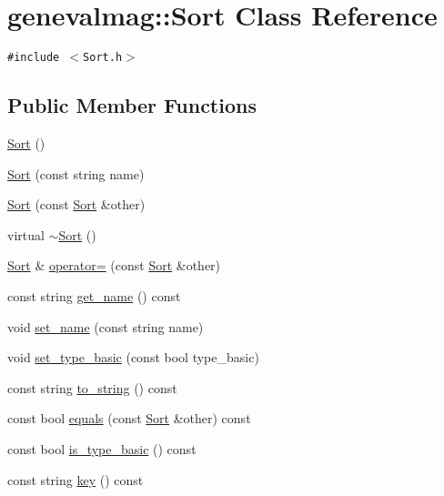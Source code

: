 \hypertarget{classgenevalmag_1_1Sort}{
\section{genevalmag::Sort Class Reference}
\label{classgenevalmag_1_1Sort}
}
{\tt \#include $<$Sort.h$>$}

\subsection*{Public Member Functions}
\begin{CompactItemize}
\item 
\hyperlink{classgenevalmag_1_1Sort_e16fdd544e5e88954b272d746014b34f}{Sort} ()
\item 
\hyperlink{classgenevalmag_1_1Sort_741ce3c7c95b313f4a7d04588d2f32ec}{Sort} (const string name)
\item 
\hyperlink{classgenevalmag_1_1Sort_b2cce40fbf624c23b0371c3a7f931ac4}{Sort} (const \hyperlink{classgenevalmag_1_1Sort}{Sort} \&other)
\item 
virtual \hyperlink{classgenevalmag_1_1Sort_14a311f8129e51ee0005a3f694eeb56d}{$\sim$Sort} ()
\item 
\hyperlink{classgenevalmag_1_1Sort}{Sort} \& \hyperlink{classgenevalmag_1_1Sort_c04dccc91f8c8bec5af9b86f9f3c7b7a}{operator=} (const \hyperlink{classgenevalmag_1_1Sort}{Sort} \&other)
\item 
const string \hyperlink{classgenevalmag_1_1Sort_5bbccf82148fea12f958bd276a009fd4}{get\_\-name} () const 
\item 
void \hyperlink{classgenevalmag_1_1Sort_b98ad164260650cae11a6a712d1808d5}{set\_\-name} (const string name)
\item 
void \hyperlink{classgenevalmag_1_1Sort_ef4090cc2961e5f9614d1db43386d485}{set\_\-type\_\-basic} (const bool type\_\-basic)
\item 
const string \hyperlink{classgenevalmag_1_1Sort_669e4c331b862e2970738c3e9ad88749}{to\_\-string} () const 
\item 
const bool \hyperlink{classgenevalmag_1_1Sort_81590adfe2e0c4703a0d93d2e34aa3d1}{equals} (const \hyperlink{classgenevalmag_1_1Sort}{Sort} \&other) const 
\item 
const bool \hyperlink{classgenevalmag_1_1Sort_e6ede6f432ec5cc83a103efbd2493cf9}{is\_\-type\_\-basic} () const 
\item 
const string \hyperlink{classgenevalmag_1_1Sort_68cc79c2d28feb6d24173adcfc4864ce}{key} () const 
\end{CompactItemize}
